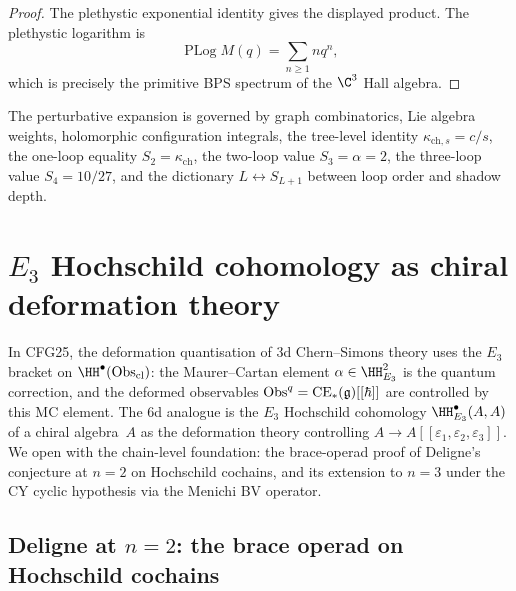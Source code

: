 \begin{proof}
The plethystic exponential identity gives the displayed product. The
plethystic logarithm is
\[
 \operatorname{PLog}M(q)=\sum_{n\geq 1}nq^n,
\]
which is precisely the primitive BPS spectrum of the \(\C^3\) Hall
algebra.
\end{proof}

\begin{remark}
\label{rem:perturbative-feynman-summary}
The perturbative expansion is governed by graph combinatorics, Lie
algebra weights, holomorphic configuration integrals, the tree-level
identity $\kappa_{\mathrm{ch},s}=c/s$, the one-loop equality
$S_2=\kappa_{\mathrm{ch}}$, the two-loop value $S_3=\alpha=2$, the
three-loop value $S_4=10/27$, and the dictionary
$L\leftrightarrow S_{L+1}$ between loop order and shadow depth.
\end{remark}


\section{\texorpdfstring{$E_3$}{E-3} Hochschild cohomology as chiral deformation theory}
\label{sec:e3-hochschild-deformation-theory}

In CFG25, the deformation quantisation of 3d Chern--Simons theory uses the $E_3$ bracket on $\HH^\bullet(\mathrm{Obs}_{\mathrm{cl}})$: the Maurer--Cartan element $\alpha \in \HH^2_{E_3}$ is the quantum correction, and the deformed observables $\mathrm{Obs}^q = \mathrm{CE}_*({\frak g})[[\hbar]]$ are controlled by this MC element. The 6d analogue is the $E_3$ Hochschild cohomology $\HH^\bullet_{E_3}(A, A)$ of a chiral algebra~$A$ as the deformation theory controlling $A \to A[[\varepsilon_1, \varepsilon_2, \varepsilon_3]]$. We open with the chain-level foundation: the brace-operad proof of Deligne's conjecture at $n = 2$ on Hochschild cochains, and its extension to $n = 3$ under the CY cyclic hypothesis via the Menichi BV operator.

\subsection{Deligne at \texorpdfstring{$n = 2$}{n=2}: the brace operad on Hochschild cochains}
\label{subsec:deligne-n2-brace}

